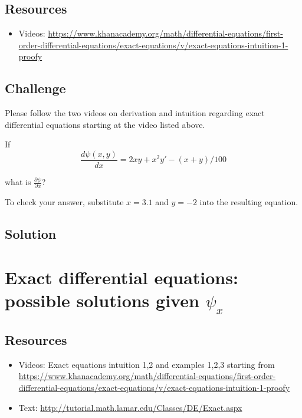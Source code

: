 \subsection*{Resources}
\begin{itemize}
    \item Videos: \url{https://www.khanacademy.org/math/differential-equations/first-order-differential-equations/exact-equations/v/exact-equations-intuition-1-proofy}
\end{itemize}

\subsection*{Challenge}
Please follow the two videos on derivation and intuition regarding exact differential equations starting at the video listed above.

If
\begin{equation}
    \frac{d \psi(x,y)}{dx} = 2xy + x^2y' - (x+y)/100
\end{equation}

what is $\displaystyle \frac{\partial \psi}{\partial x}$?

To check your answer, substitute $x=3.1$ and $y=-2$ into the resulting equation.

\subsection*{Solution}
\six{}





\newpage
\section{Exact differential equations: possible solutions given $\psi_x$}

\subsection*{Resources}
\begin{itemize}
    \item Videos: Exact equations intuition 1,2 and examples 1,2,3 starting from \url{https://www.khanacademy.org/math/differential-equations/first-order-differential-equations/exact-equations/v/exact-equations-intuition-1-proofy}
    \item Text: \url{http://tutorial.math.lamar.edu/Classes/DE/Exact.aspx}
\end{itemize}


